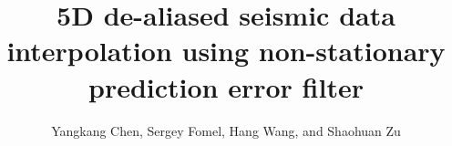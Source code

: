 

\title{5D de-aliased seismic data interpolation using non-stationary prediction error filter}

\author{Yangkang Chen\footnotemark[1], Sergey Fomel\footnotemark[2], Hang Wang\footnotemark[1], and Shaohuan Zu\footnotemark[3]}

\renewcommand{\thefootnote}{\fnsymbol{footnote}}



\address{
\footnotemark[1]
School of Earth Sciences\\
Zhejiang University\\
Hangzhou, Zhejiang Province, China, 310027\\
chenyk2016@gmail.com \\
\footnotemark[2]Bureau of Economic Geology \\
John A. and Katherine G. Jackson School of Geosciences \\
The University of Texas at Austin \\
University Station, Box X \\
Austin, TX 78713-8924 \\
sergey.fomel@beg.utexas.edu\\
\footnotemark[3] College of Geophysics\\
Chengdu University of Technology \\
Dongsanlu, Erxianqiao, Chengdu 610059, Sichuan, China\\
Corresponding author: Yangkang Chen, chenyk2016@gmail.com
}


\maketitle


